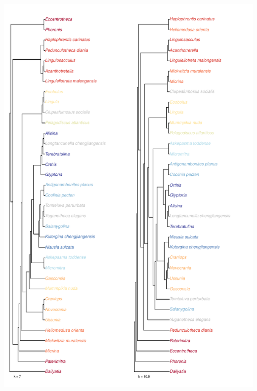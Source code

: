 \documentclass[]{book}
\theoremstyle{definition}
\theoremstyle{definition}
\theoremstyle{definition}
\theoremstyle{remark}
\begin{document}
\includegraphics{Brachiopod_phylogeny_files/figure-latex/unnamed-chunk-6-3.pdf}
\end{document}
